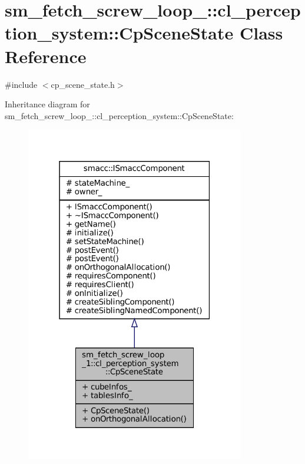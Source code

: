 \hypertarget{classsm__fetch__screw__loop__1_1_1cl__perception__system_1_1CpSceneState}{}\section{sm\+\_\+fetch\+\_\+screw\+\_\+loop\+\_\+:\+:cl\+\_\+perception\+\_\+system\+:\+:Cp\+Scene\+State Class Reference}
\label{classsm__fetch__screw__loop__1_1_1cl__perception__system_1_1CpSceneState}


{\ttfamily \#include $<$cp\+\_\+scene\+\_\+state.\+h$>$}



Inheritance diagram for sm\+\_\+fetch\+\_\+screw\+\_\+loop\+\_\+:\+:cl\+\_\+perception\+\_\+system\+:\+:Cp\+Scene\+State\+:
\nopagebreak
\begin{figure}[H]
\begin{center}
\leavevmode
\includegraphics[width=271pt]{classsm__fetch__screw__loop__1_1_1cl__perception__system_1_1CpSceneState__inherit__graph}
\end{center}
\end{figure}


